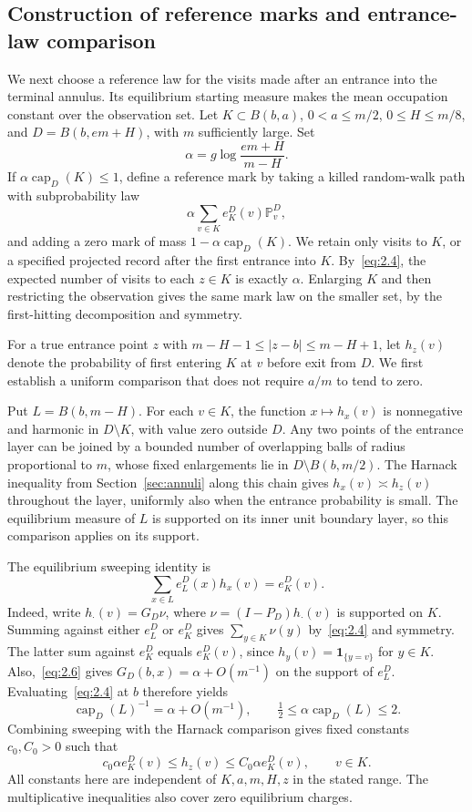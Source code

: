 \documentclass[11pt,letterpaper,reqno]{amsart}
\numberwithin{equation}{section}
\theoremstyle{remark}
\begin{document}
\subsection{Construction of reference marks and entrance-law comparison}\label{sec:marks}
We next choose a reference law for the visits made after an entrance into the terminal annulus. Its equilibrium starting measure makes the mean occupation constant over the observation set. Let $K\subset B(b,a)$, $0<a\le m/2$, $0\le H\le m/8$, and $D=B(b,em+H)$, with $m$ sufficiently large. Set
\[
\alpha=g\log\frac{em+H}{m-H}.
\]
If $\alpha\operatorname{cap}_D(K)\le1$, define a reference mark by taking a killed random-walk path with subprobability law
\begin{equation}\label{eq:2.14}
\alpha\sum_{v\in K}e_K^D(v)\mathbb P_v^D,
\end{equation}
and adding a zero mark of mass $1-\alpha\operatorname{cap}_D(K)$. We retain only visits to $K$, or a specified projected record after the first entrance into $K$. By~\eqref{eq:2.4}, the expected number of visits to each $z\in K$ is exactly $\alpha$. Enlarging $K$ and then restricting the observation gives the same mark law on the smaller set, by the first-hitting decomposition and symmetry.

For a true entrance point $z$ with $m-H-1\le|z-b|\le m-H+1$, let $h_z(v)$ denote the probability of first entering $K$ at $v$ before exit from $D$. We first establish a uniform comparison that does not require $a/m$ to tend to zero.

Put $L=B(b,m-H)$. For each $v\in K$, the function $x\mapsto h_x(v)$ is nonnegative and harmonic in $D\setminus K$, with value zero outside $D$. Any two points of the entrance layer can be joined by a bounded number of overlapping balls of radius proportional to $m$, whose fixed enlargements lie in $D\setminus B(b,m/2)$. The Harnack inequality from Section~\ref{sec:annuli} along this chain gives $h_x(v)\asymp h_z(v)$ throughout the layer, uniformly also when the entrance probability is small. The equilibrium measure of $L$ is supported on its inner unit boundary layer, so this comparison applies on its support.

The equilibrium sweeping identity is
\[
\sum_{x\in L}e_L^D(x)h_x(v)=e_K^D(v).
\]
Indeed, write $h_\cdot(v)=G_D\nu$, where $\nu=(I-P_D)h_\cdot(v)$ is supported on $K$. Summing against either $e_L^D$ or $e_K^D$ gives $\sum_{y\in K}\nu(y)$ by~\eqref{eq:2.4} and symmetry. The latter sum against $e_K^D$ equals $e_K^D(v)$, since $h_y(v)=\mathbf1_{\{y=v\}}$ for $y\in K$.
Also,~\eqref{eq:2.6} gives $G_D(b,x)=\alpha+O(m^{-1})$ on the support of $e_L^D$. Evaluating~\eqref{eq:2.4} at $b$ therefore yields
\[
\operatorname{cap}_D(L)^{-1}=\alpha+O(m^{-1}),\qquad
\tfrac12\le\alpha\operatorname{cap}_D(L)\le2.
\]
Combining sweeping with the Harnack comparison gives fixed constants $c_0,C_0>0$ such that
\[
c_0\alpha e_K^D(v)\le h_z(v)\le C_0\alpha e_K^D(v),
\qquad v\in K.
\]
All constants here are independent of $K,a,m,H,z$ in the stated range. The multiplicative inequalities also cover zero equilibrium charges.
\end{document}
